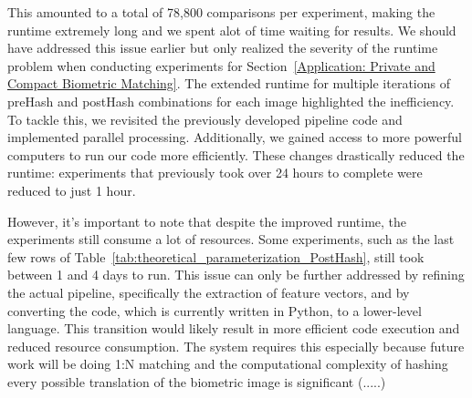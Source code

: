 This amounted to a total of 78,800 comparisons per experiment, making the runtime extremely long and we spent alot of time waiting for results. We should have addressed this issue earlier but only realized the severity of the runtime problem when conducting experiments for Section~\ref{Application: Private and Compact Biometric Matching}. The extended runtime for multiple iterations of preHash and postHash combinations for each image highlighted the inefficiency. To tackle this, we revisited the previously developed pipeline code and implemented parallel processing. Additionally, we gained access to more powerful computers to run our code more efficiently. These changes drastically reduced the runtime: experiments that previously took over 24 hours to complete were reduced to just 1 hour.

However, it's important to note that despite the improved runtime, the experiments still consume a lot of resources. Some experiments, such as the last few rows of Table~\ref{tab:theoretical_parameterization_PostHash}, still took between 1 and 4 days to run. This issue can only be further addressed by refining the actual pipeline, specifically the extraction of feature vectors, and by converting the code, which is currently written in Python, to a lower-level language. This transition would likely result in more efficient code execution and reduced resource consumption. The system requires this especially because future work will be doing 1:N matching and the computational complexity of hashing every possible translation of the biometric image is significant (.....)
